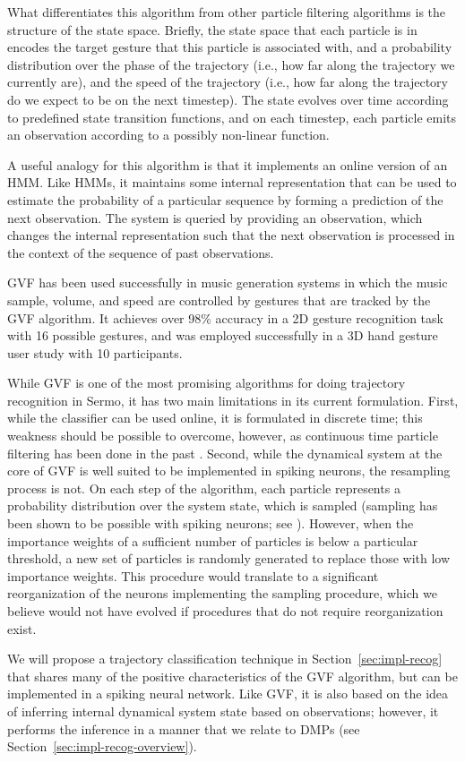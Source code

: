 What differentiates this algorithm from
other particle filtering algorithms
is the structure of the state space.
Briefly, the state space that each particle is in
encodes the target gesture that this particle
is associated with,
and a probability distribution
over the phase of the trajectory
(i.e., how far along the trajectory
we currently are),
and the speed of the trajectory
(i.e., how far along the trajectory
do we expect to be on the next timestep).
The state evolves over time according to
predefined state transition functions,
and on each timestep,
each particle emits an observation
according to a possibly non-linear function.

A useful analogy for this algorithm
is that it implements an online version of an HMM.
Like HMMs, it maintains some internal representation
that can be used to estimate the probability
of a particular sequence
by forming a prediction
of the next observation.
The system is queried by providing
an observation,
which changes the internal representation
such that the next observation
is processed in the context of
the sequence of past observations.

GVF has been used successfully
in music generation systems
in which the music sample,
volume, and speed are
controlled by gestures
that are tracked by the GVF algorithm.
It achieves over 98\% accuracy
in a 2D gesture recognition task
with 16 possible gestures,
and was employed successfully
in a 3D hand gesture user study
with 10 participants.

While GVF is one of the most promising
algorithms for doing trajectory recognition
in Sermo,
it has two main limitations in its current formulation.
First, while the classifier can be used online,
it is formulated in discrete time;
this weakness should be possible to overcome,
however, as continuous time particle filtering
has been done in the past
\cite{ng2005}.
Second, while the dynamical system
at the core of GVF is well suited
to be implemented in spiking neurons,
the resampling process is not.
On each step of the algorithm,
each particle represents a probability
distribution over the system state,
which is sampled
(sampling has been shown to be
possible with spiking neurons;
see \cite{buesing2011}).
However, when the importance weights
of a sufficient number of particles
is below a particular threshold,
a new set of particles
is randomly generated
to replace those with low importance weights.
This procedure would translate to
a significant reorganization
of the neurons implementing
the sampling procedure,
which we believe
would not have evolved if
procedures that do not require
reorganization exist.

We will propose a trajectory classification technique
in Section~\ref{sec:impl-recog}
that shares many of the positive
characteristics of the GVF algorithm,
but can be implemented in a spiking neural network.
Like GVF, it is also based on the idea
of inferring internal dynamical system state
based on observations;
however, it performs the inference
in a manner that we relate to
DMPs (see Section~\ref{sec:impl-recog-overview}).
